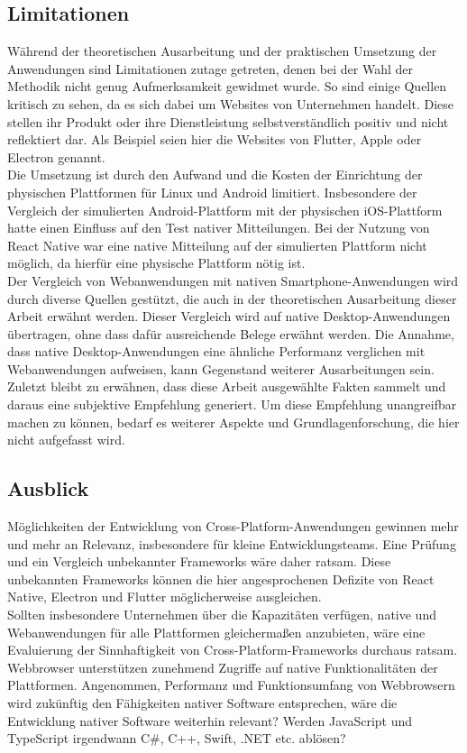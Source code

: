 \documentclass[a4paper]{scrartcl}
\begin{document}
\subsection{Limitationen}
Während der theoretischen Ausarbeitung und der praktischen Umsetzung der Anwendungen sind Limitationen zutage getreten, denen bei der Wahl der Methodik nicht genug Aufmerksamkeit gewidmet wurde. So sind einige Quellen kritisch zu sehen, da es sich dabei um Websites von Unternehmen handelt. Diese stellen ihr Produkt oder ihre Dienstleistung selbstverständlich positiv und nicht reflektiert dar. Als Beispiel seien hier die Websites von Flutter, Apple oder Electron genannt. \\
Die Umsetzung ist durch den Aufwand und die Kosten der Einrichtung der physischen Plattformen für Linux und Android limitiert. Insbesondere der Vergleich der simulierten Android-Plattform mit der physischen iOS-Plattform hatte einen Einfluss auf den Test nativer Mitteilungen. Bei der Nutzung von React Native war eine native Mitteilung auf der simulierten Plattform nicht möglich, da hierfür eine physische Plattform nötig ist. \\
Der Vergleich von Webanwendungen mit nativen Smartphone-Anwendungen wird durch diverse Quellen gestützt, die auch in der theoretischen Ausarbeitung dieser Arbeit erwähnt werden. Dieser Vergleich wird auf native Desktop-Anwendungen übertragen, ohne dass dafür ausreichende Belege erwähnt werden. Die Annahme, dass native Desktop-Anwendungen eine ähnliche Performanz verglichen mit Webanwendungen aufweisen, kann Gegenstand weiterer Ausarbeitungen sein. \\
Zuletzt bleibt zu erwähnen, dass diese Arbeit ausgewählte Fakten sammelt und daraus eine subjektive Empfehlung generiert. Um diese Empfehlung unangreifbar machen zu können, bedarf es weiterer Aspekte und Grundlagenforschung, die hier nicht aufgefasst wird.

\subsection{Ausblick}
Möglichkeiten der Entwicklung von Cross-Platform-Anwendungen gewinnen mehr und mehr an Relevanz, insbesondere für kleine Entwicklungsteams. Eine Prüfung und ein Vergleich unbekannter Frameworks wäre daher ratsam. Diese unbekannten Frameworks können die hier angesprochenen Defizite von React Native, Electron und Flutter möglicherweise ausgleichen. \\
Sollten insbesondere Unternehmen über die Kapazitäten verfügen, native und Webanwendungen für alle Plattformen gleichermaßen anzubieten, wäre eine Evaluierung der Sinnhaftigkeit von Cross-Platform-Frameworks durchaus ratsam. \\
Webbrowser unterstützen zunehmend Zugriffe auf native Funktionalitäten der Plattformen. Angenommen, Performanz und Funktionsumfang von Webbrowsern wird zukünftig den Fähigkeiten nativer Software entsprechen, wäre die Entwicklung nativer Software weiterhin relevant? Werden JavaScript und TypeScript irgendwann C\#, C++, Swift, .NET etc. ablösen?
\end{document}
